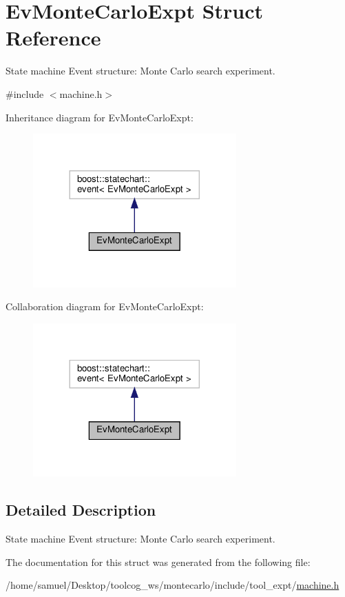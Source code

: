 \hypertarget{structEvMonteCarloExpt}{}\section{Ev\+Monte\+Carlo\+Expt Struct Reference}
\label{structEvMonteCarloExpt}


State machine Event structure\+: Monte Carlo search experiment.  




{\ttfamily \#include $<$machine.\+h$>$}



Inheritance diagram for Ev\+Monte\+Carlo\+Expt\+:
\nopagebreak
\begin{figure}[H]
\begin{center}
\leavevmode
\includegraphics[width=221pt]{structEvMonteCarloExpt__inherit__graph}
\end{center}
\end{figure}


Collaboration diagram for Ev\+Monte\+Carlo\+Expt\+:
\nopagebreak
\begin{figure}[H]
\begin{center}
\leavevmode
\includegraphics[width=221pt]{structEvMonteCarloExpt__coll__graph}
\end{center}
\end{figure}


\subsection{Detailed Description}
State machine Event structure\+: Monte Carlo search experiment. 

The documentation for this struct was generated from the following file\+:\begin{DoxyCompactItemize}
\item 
/home/samuel/\+Desktop/toolcog\+\_\+ws/montecarlo/include/tool\+\_\+expt/\hyperlink{machine_8h}{machine.\+h}\end{DoxyCompactItemize}
